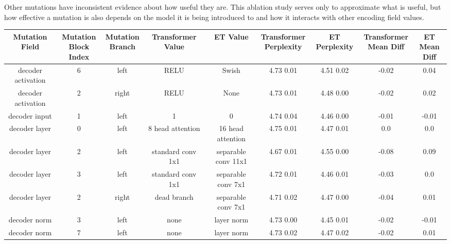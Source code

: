 \documentclass{article}
\begin{document}
Other mutations have inconsistent evidence about how useful they are. This ablation study serves only to approximate what is useful, but how effective a mutation is also depends on the model it is being introduced to and how it interacts with other encoding field values. 

\renewcommand\theadfont{\tiny\scshape}
\begin{table*}[ht]
\begin{center}
\begin{tiny}
\begin{sc}
\begin{tabular}{ccccccccc}
\toprule
Mutation Field & \thead{Mutation \\ Block Index} & \thead{Mutation \\ Branch} & Transformer Value & ET Value & \thead{Transformer \\ Perplexity} & ET Perplexity & \thead{Transformer \\ Mean Diff} & \thead{ET \\ Mean Diff} \\
\midrule
decoder activation & 6 & left & RELU & Swish & 4.73  0.01 & 4.51  0.02 & \cellcolor{Green}-0.02 & \cellcolor{Green}0.04 \\
decoder activation & 2 & right & RELU & None & 4.73  0.01 & 4.48  0.00 & \cellcolor{Green} -0.02 & \cellcolor{Green}0.02 \\
decoder input & 1 & left & 1 & 0 & 4.74  0.04 & 4.46  0.00 & \cellcolor{Green}-0.01 & \cellcolor{Red}-0.01 \\
decoder layer & 0 & left & 8 head attention & 16 head attention & 4.75  0.01 & 4.47  0.01 & 0.0 & 0.0 \\
decoder layer & 2 & left & standard conv 1x1 & separable conv 11x1 & 4.67  0.01 & 4.55  0.00 &  \cellcolor{Green}-0.08 & \cellcolor{Green} 0.09 \\
decoder layer & 3 & left & standard conv 1x1 & separable conv 7x1  & 4.72  0.01 & 4.46  0.01 &  \cellcolor{Green} -0.03 & 0.0 \\
decoder layer & 2 & right & dead branch & separable conv 7x1 & 4.71  0.02 & 4.47  0.00 &  \cellcolor{Green}-0.04 &  \cellcolor{Green}0.01 \\
decoder norm & 3 & left & none & layer norm & 4.73  0.00 & 4.45  0.01 &  \cellcolor{Green}-0.02 &  \cellcolor{Red}-0.01 \\
decoder norm & 7 & left & none & layer norm & 4.73  0.02 & 4.47  0.02 &  \cellcolor{Green}-0.02 & \cellcolor{Green}0.01 \\

\end{tabular}
\end{sc}
\end{tiny}
\end{center}
\end{table*}
\end{document}
